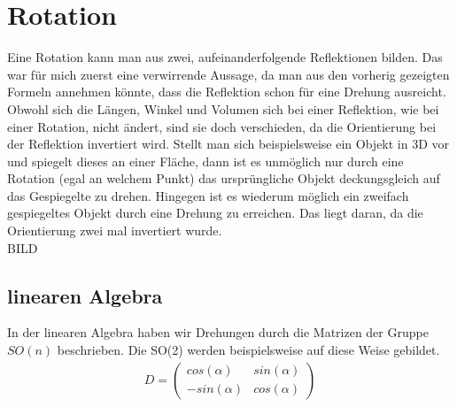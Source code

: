 %
%
%
\section{Rotation}
Eine Rotation kann man aus zwei, aufeinanderfolgende Reflektionen bilden. Das war für mich zuerst eine verwirrende Aussage, da man aus den vorherig gezeigten Formeln annehmen könnte, dass die Reflektion schon für eine Drehung ausreicht. Obwohl sich die Längen, Winkel und Volumen sich bei einer Reflektion, wie bei einer Rotation, nicht ändert, sind sie doch verschieden, da die Orientierung bei der Reflektion invertiert wird. Stellt man sich beispielsweise ein Objekt in 3D vor und spiegelt dieses an einer Fläche, dann ist es unmöglich nur durch eine Rotation (egal an welchem Punkt) das ursprüngliche Objekt deckungsgleich auf das Gespiegelte zu drehen. Hingegen ist es wiederum möglich ein zweifach gespiegeltes Objekt durch eine Drehung zu erreichen. Das liegt daran, da die Orientierung zwei mal invertiert wurde.
\\BILD

\subsection{linearen Algebra}
In der linearen Algebra haben wir Drehungen durch die Matrizen der Gruppe $SO(n)$ beschrieben. Die SO(2) werden beispielsweise auf diese Weise gebildet.
\begin{align}
	D = 
	\begin{pmatrix}
		cos(\alpha) & sin(\alpha) \\
		-sin(\alpha) & cos(\alpha) 
	\end{pmatrix}
\end{align}

